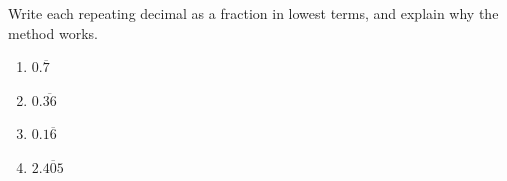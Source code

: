Write each repeating decimal as a fraction in lowest terms, and explain why the method works.
\begin{enumerate}
\item[(a)] $0.\overline{7}$
\item[(b)] $0.\overline{36}$
\item[(c)] $0.1\overline{6}$
\item[(d)] $2.\overline{405}$
\end{enumerate}
